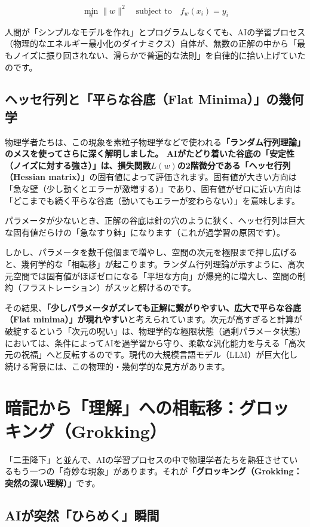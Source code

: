\[\min_w \|w\|^2 \quad \text{subject to} \quad f_w(x_i) = y_i\]

人間が「シンプルなモデルを作れ」とプログラムしなくても、AIの学習プロセス（物理的なエネルギー最小化のダイナミクス）自体が、無数の正解の中から「最もノイズに振り回されない、滑らかで普遍的な法則」を自律的に拾い上げていたのです。

\subsection{ヘッセ行列と「平らな谷底（Flat Minima）」の幾何学}

物理学者たちは、この現象を素粒子物理学などで使われる\textbf{「ランダム行列理論」のメスを使ってさらに深く解明しました。 AIがたどり着いた谷底の「安定性（ノイズに対する強さ）」は、損失関数\(L(w)\)の2階微分である「ヘッセ行列（Hessian matrix）」}の固有値によって評価されます。固有値が大きい方向は「急な壁（少し動くとエラーが激増する）」であり、固有値がゼロに近い方向は「どこまでも続く平らな谷底（動いてもエラーが変わらない）」を意味します。

パラメータが少ないとき、正解の谷底は針の穴のように狭く、ヘッセ行列は巨大な固有値だらけの「急なすり鉢」になります（これが過学習の原因です）。

しかし、パラメータを数千億個まで増やし、空間の次元を極限まで押し広げると、幾何学的な「相転移」が起こります。ランダム行列理論が示すように、高次元空間では固有値がほぼゼロになる「平坦な方向」が爆発的に増大し、空間の制約（フラストレーション）がスッと解けるのです。

その結果、\textbf{「少しパラメータがズレても正解に繋がりやすい、広大で平らな谷底（Flat minima）」が現れやすい}と考えられています。次元が高すぎると計算が破綻するという「次元の呪い」は、物理学的な極限状態（過剰パラメータ状態）においては、条件によってAIを過学習から守り、柔軟な汎化能力を与える「高次元の祝福」へと反転するのです。現代の大規模言語モデル（LLM）が巨大化し続ける背景には、この物理的・幾何学的な見方があります。

\section{暗記から「理解」への相転移：グロッキング（Grokking）}

「二重降下」と並んで、AIの学習プロセスの中で物理学者たちを熱狂させているもう一つの「奇妙な現象」があります。それが\textbf{「グロッキング（Grokking：突然の深い理解）」}です。

\subsection{AIが突然「ひらめく」瞬間}

